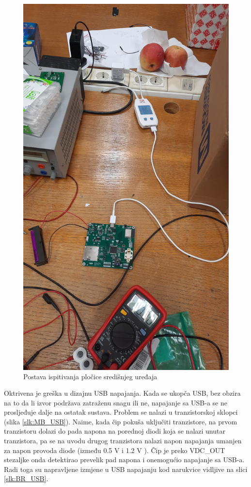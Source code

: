\begin{figure}[htb]
    \centering
    \includegraphics[width=10 cm]{Figures/MB_TEST_02.jpg}
    \caption{Postava ispitivanja pločice središnjeg uređaja}
    \label{slk:MB_TEST_02}
\end{figure}

Oktrivena je greška u dizajnu USB napajanja. Kada se ukopča USB, bez obzira na to da li izvor podržava zatraženu snagu ili ne, napajanje sa USB-a se ne prosljeđuje dalje na ostatak sustava. Problem se nalazi u tranzistorskoj sklopci (slika \ref{slk:MB_USB}). Naime, kada čip pokuša uključiti tranzistore, na prvom tranzistoru dolazi do pada napona na porednoj diodi koja se nalazi unutar tranzistora, pa se na uvodu drugog tranzistora nalazi napon napajanja umanjen za napon provoda diode (između 0.5 V i 1.2 V \cite{di:dmp3098}). Čip je preko VDC\_OUT stezaljke onda detektirao prevelik pad napona i onemogućio napajanje sa USB-a. Radi toga su napravljene izmjene u USB napajanju kod narukvice vidljive na slici \ref{slk:BR_USB}.

